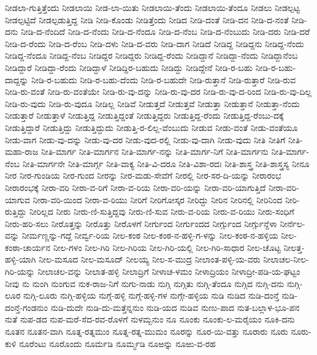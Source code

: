 ನೀಡಲಾ-ಗುತ್ತಿತ್ತೆಂದು
ನೀಡಲಾಯಿ
ನೀಡ-ಲಾ-ಯಿತು
ನೀಡಲಾಯಿ-ತೆಂದು
ನೀಡಲಾಯಿ-ತೆಂದೂ
ನೀಡಲು
ನೀಡಲ್ಪಟ್ಟ
ನೀಡಲ್ಪಟ್ಟಿದೆ
ನೀಡಲ್ಪಡುತ್ತಿದ್ದ
ನೀಡಿ
ನೀಡಿ-ಕೊಂಡು
ನೀಡಿತ್ತೆಂದು
ನೀಡಿದ
ನೀಡಿ-ದಂತೆ
ನೀಡಿ-ದನ
ನೀಡಿ-ದ-ನಂತೆ
ನೀಡಿ-ದನು
ನೀಡಿ-ದ-ನೆಂದಿದೆ
ನೀಡಿ-ದ-ನೆಂದು
ನೀಡಿ-ದ-ನೆಂದೂ
ನೀಡಿ-ದ-ನೆಂಬ
ನೀಡಿ-ದ-ನೆಂಬುದು
ನೀಡಿ-ದರು
ನೀಡಿ-ದರೆ
ನೀಡಿ-ದ-ರೆಂದು
ನೀಡಿ-ದ-ರೆಂಬ
ನೀಡಿ-ದಳು
ನೀಡಿ-ದ-ವರು
ನೀಡಿ-ದಾಗ
ನೀಡಿದೆ
ನೀಡಿದ್ದ
ನೀಡಿದ್ದನು
ನೀಡಿದ್ದ-ನೆಂದು
ನೀಡಿದ್ದ-ನೆಂದೂ
ನೀಡಿದ್ದ-ನೆಂಬ
ನೀಡಿದ್ದರ
ನೀಡಿದ್ದರು
ನೀಡಿದ್ದ-ರೆಂದು
ನೀಡಿದ್ದಾನೆ
ನೀಡಿದ್ದಾ-ನೆಂದು
ನೀಡಿದ್ದಾನೆಂಬ
ನೀಡಿದ್ದಾರೆ
ನೀಡಿದ್ದಾ-ರೆಂದು
ನೀಡಿದ್ದಾಳೆ
ನೀಡಿದ್ದಿರ-ಬಹುದು
ನೀಡಿದ್ದು
ನೀಡಿದ್ದೇನೆ
ನೀಡಿ-ರ-ಬಹು
ನೀಡಿ-ರ-ಬಹು-ದಾದ್ದನ್ನು
ನೀಡಿ-ರ-ಬಹುದು
ನೀಡಿ-ರ-ಬಹು-ದೆಂದು
ನೀಡಿ-ರ-ಬಹುದೇ
ನೀಡಿ-ರುತ್ತಾನೆ
ನೀಡಿ-ರುತ್ತಾರೆ
ನೀಡಿ-ರುವ
ನೀಡಿ-ರು-ವಂತೆ
ನೀಡಿ-ರು-ವಂತೆಯೇ
ನೀಡಿ-ರು-ವು-ದನ್ನು
ನೀಡಿ-ರು-ವು-ದರ
ನೀಡಿ-ರು-ವು-ದ-ರಿಂದ
ನೀಡಿ-ರು-ವು-ದಿಲ್ಲ
ನೀಡಿ-ರು-ವುದು
ನೀಡಿ-ರು-ವುದೂ
ನೀಡಿಲ್ಲ
ನೀಡಿವೆ
ನೀಡುತ್ತದೆ
ನೀಡುತ್ತವೆ
ನೀಡುತ್ತಾ
ನೀಡುತ್ತಾನೆ
ನೀಡುತ್ತಾ-ನೆಂದು
ನೀಡುತ್ತಾರೆ
ನೀಡುತ್ತಾಳೆ
ನೀಡುತ್ತಿದ್ದ
ನೀಡುತ್ತಿದ್ದಂತೆ
ನೀಡುತ್ತಿದ್ದರು
ನೀಡುತ್ತಿದ್ದ-ರೆಂದು
ನೀಡುತ್ತಿದ್ದ-ರೆಂಬು-ದಕ್ಕೆ
ನೀಡುತ್ತಿದ್ದಾರೆ
ನೀಡುತ್ತಿದ್ದು
ನೀಡುತ್ತಿದ್ದುದು
ನೀಡುತ್ತಿ-ರ-ಲಿಲ್ಲ-ವೆಂಬುದು
ನೀಡುವ
ನೀಡು-ವಂತೆ
ನೀಡು-ವಂತೆಯೂ
ನೀಡು-ವಾಗ
ನೀಡು-ವು-ದನ್ನು
ನೀಡು-ವು-ದರ
ನೀಡು-ವುದ-ರಲ್ಲಿ
ನೀಡು-ವು-ದಾಗಿ
ನೀಡು-ವುದು
ನೀತಿ
ನೀತಿಗೆ
ನೀತಿ-ಮಹಾ-ರಾಜ
ನೀತಿ-ಮಾರ್ಗ
ನೀತಿ-ಮಾರ್ಗನ
ನೀತಿ-ಮಾರ್ಗ-ನನ್ನು
ನೀತಿ-ಮಾರ್ಗ-ನಿಗೆ
ನೀತಿ-ಮಾರ್ಗನು
ನೀತಿ-ಮಾರ್ಗ-ನೆಂಬ
ನೀತಿ-ಮಾರ್ಗನೇ
ನೀತಿ-ಮಾರ್ಗ್ಗ
ನೀತಿ-ವಾಕ್ಯ
ನೀತಿ-ವಿ-ದರೂ
ನೀತಿ-ವಿಶಾ-ರದಃ
ನೀತಿ-ಶಾಸ್ತ್ರ
ನೀತಿ-ಶಾಸ್ತ್ರಸ್ಯ
ನೀನೂ
ನೀರ
ನೀರ-ಗುಂಡಿಯ
ನೀರ-ಗುಂದ
ನೀರನ್ನು
ನೀರ-ಮಡು-ಸೇವೆಗೆ
ನೀರಲ್ಲಿ
ನೀರ-ಸರ-ದಿ-ಯನ್ನು
ನೀರಾರಂಭ
ನೀರಾರಂಭಕ್ಕೆ
ನೀರಾ-ವರಿ
ನೀರಾ-ವ-ರಿಗೆ
ನೀರಾ-ವ-ರಿಯ
ನೀರಾ-ವರಿ-ಯನ್ನು
ನೀರಾ-ವರಿ-ಯಾಗುತ್ತಿದೆ
ನೀರಾ-ವರಿ-ಯಾಗುವ
ನೀರಾ-ವರಿ-ಯಿಂದ
ನೀರಾ-ವ-ರಿಯು
ನೀರಿಗೆ
ನೀರಿಗೋಸ್ಕರ
ನೀರಿದ್ದು
ನೀರಿನ
ನೀರಿನಲ್ಲಿ
ನೀರಿನಿಂದ
ನೀರಿ-ರುತ್ತಿದ್ದು
ನೀರಿಲ್ಲದ
ನೀರು
ನೀರು-ಣಿ-ಸುತ್ತಿದ್ದವು
ನೀರು-ಣಿ-ಸುವ
ನೀರು-ವ-ರಿಯ
ನೀರು-ವ-ರಿಯು
ನೀರು-ಸಂಧಿಗೆ
ನೀರು-ಹರಿ-ಸಲು
ನೀರೊತ್ತನ್ನು
ನೀರೊತ್ತು
ನೀರೊಳಗೆ
ನೀರ್ಗುಂದ
ನೀರ್ಗುಂದದ
ನೀರ್ಗ್ಗುಂದ
ನೀರ್ಗ್ಗುನ್ದೆಳಾ
ನೀರ್ನೆಲ-ವನ್ನು
ನೀರ್ಮಣ್ಣನ್ನು-ಗದ್ದೆ
ನೀರ್ವ್ವ-ರಿಯ
ನೀಲ-ಕಂಠ
ನೀಲ-ಕಂಠ-ನ-ಹಳ್ಳಿ-ಗ-ಳನ್ನು
ನೀಲ-ಕಂಠ-ನ-ಹಳ್ಳಿಯ
ನೀಲ-ಕಂಠಾ-ಚಾರ್ಯನ
ನೀಲ-ಗಳಂ
ನೀಲ-ಗಿರಿ
ನೀಲ-ಗಿರಿಯ
ನೀಲ-ಗಿರಿ-ಯಲ್ಲಿ
ನೀಲ-ಗಿರಿ-ಸಾಧಾರ
ನೀಲ-ಚೊಟ್ಟ
ನೀಲತ್ತ-ಹಳ್ಳಿ-ಯಾಗಿ
ನೀಲ-ಮಸೂದ
ನೀಲ-ಮಸೂದ್
ನೀಲಯ್ಯ
ನೀಲ-ಸ-ಮುದ್ರ
ನೀಲಾಂತ-ಪಳ್ಳಿ-ಯ-ವರು
ನೀಲಾಚಲ-ನೀಲ-ಗಿರಿ-ಯನ್ನು
ನೀಲಾಚಲ-ವನ್ನು
ನೀಲಾತ-ಹಳ್ಳಿ
ನೀಲಾದ್ರಿಗೆ
ನೀಳಾಚ-ಳಮಂ
ನೀಳಾದ್ರಿಯಂ
ನೀಳಾದ್ರೀ-ಪಡಿ-ಯ-ಘಟ್ಟಂ
ನೀವು
ನು
ನುಂಗಿ
ನುಂಗುವ
ನುಕ-ರಾಜ-ನಿಗೆ
ನುಗು-ನಾಡು
ನುಗ್ಗಿ
ನುಗ್ಗಿತು
ನುಗ್ಗಿ-ತೆಂದೂ
ನುಗ್ಗಿದ
ನುಗ್ಗಿ-ದನು
ನುಗ್ಗಿ-ಲೂರ
ನುಗ್ಗಿ-ಲೂರು
ನುಗ್ಗಿ-ಹಳ್ಳಿಯ
ನುಗ್ಗೆ-ಹಳ್ಳಿ
ನುಗ್ಗೆ-ಹಳ್ಳಿ-ಗಳ
ನುಗ್ಗೇ-ಹಳ್ಳಿಯ
ನುಡಿ
ನುಡಿದ
ನುಡಿ-ದಂನ್ತೆ
ನುಡಿ-ದಂನ್ತೆ-ಗಂಡನುಂ
ನುಡಿ-ದುದೇ
ನುಡಿ-ದು-ಮತ್ತೆನ್ನನುಂ
ನುಡಿ-ಯದ
ನುಡಿವ
ನುಣು-ಪಾದ
ನುತ-ಬಲ್ಲಾಳ-ಭೂ-ಪನ
ನುತೆ
ನುಪ-ಡದ
ನುಪ-ಮರೆ-ಸೆದ-ರವ-ರೊಳಗೆ
ನುಳಮ್ಬನುಂ
ನೂ
ನೂಂಕು
ನೂಂಕು-ಲ-ಮರೈಯಂ
ನೂಕಿ-ದನು
ನೂತನ
ನೂತನ-ವಾಗಿ
ನೂತ್ನ-ರತ್ನಮುಂ
ನೂತ್ನ-ರತ್ನ-ಮುಮಂ
ನೂರನ್ನು
ನೂರ-ಯಿ-ವತ್ತು
ನೂರಾರು
ನೂರು
ನೂರು-ಕುಳಿ
ನೂರೆಂಟು
ನೂರೊಂದು
ನೂರ್ಮಡಿ
ನೂರ್ಮ್ಮಡಿ
ನೂಱನ್ನು
ನೂಱು-ವ-ರಹ
